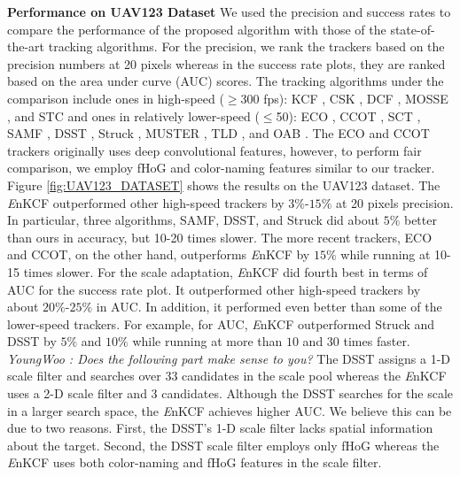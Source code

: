 \documentclass[10pt,twocolumn,letterpaper]{article}
\begin{document}
\textbf{Performance on UAV123 Dataset} We used the precision and
success rates to compare the performance of the proposed algorithm with
those of the state-of-the-art tracking algorithms. For the precision,
we rank the trackers based on the precision numbers at 20 pixels
whereas in the success rate plots, they are ranked based on the area under
curve (AUC) scores. The tracking algorithms under the comparison
include ones in high-speed ($\geq$300 fps): KCF
\cite{henriques2015high}, CSK \cite{henriques2012exploiting}, DCF
\cite{henriques2015high}, MOSSE \cite{bolme2010visual}, and STC
\cite{zhang2014fast} and ones in relatively lower-speed ($\leq$50):
ECO \cite{DanelljanCVPR2017}, CCOT \cite{DanelljanECCV2016}, SCT
\cite{Choi_2016_CVPR}, SAMF \cite{li2014scale}, DSST
\cite{danelljan2014accurate}, Struck \cite{hare2012efficient}, MUSTER
\cite{hong2015multi}, TLD \cite{kalal2012tracking}, and OAB
\cite{zhang2012robust}. The ECO and CCOT trackers originally uses deep
convolutional features, however, to perform fair comparison, we employ
fHoG and color-naming features similar to our tracker. Figure
\ref{fig:UAV123_DATASET} shows the results on the UAV123 dataset. The
{\it E}nKCF outperformed other high-speed trackers by $3\%$-$15\%$
at 20 pixels precision. In particular, three algorithms, SAMF,
DSST, and Struck did about $5\%$ better than ours in accuracy, but
10-20 times slower. The more recent trackers, ECO and CCOT, on the
other hand, outperforms {\it E}nKCF by $15\%$ while running at
10-15 times slower. For the scale adaptation, {\it E}nKCF did
fourth best in terms of AUC for the success rate plot. It
outperformed other high-speed trackers by about $20\%$-$25\%$ in
AUC. In addition, it performed even better than some of the
lower-speed trackers.  For example, for AUC, {\it E}nKCF
outperformed Struck and DSST by $5\%$ and $10\%$ while running at
more than $10$ and $30$ times faster. 
\textit{YoungWoo : Does the following part make sense to you?}
The DSST assigns a 1-D scale filter and searches over 33 candidates in the scale pool whereas the {\it E}nKCF
uses a 2-D scale filter and 3 candidates. Although the DSST searches for the scale in a larger search space, the {\it E}nKCF
achieves higher AUC. We believe this can be due to two reasons. First, the DSST's 1-D scale filter lacks spatial information about
the target. Second, the DSST scale filter employs only fHoG whereas the {\it E}nKCF uses both color-naming and fHoG features
in the scale filter.
\end{document}
